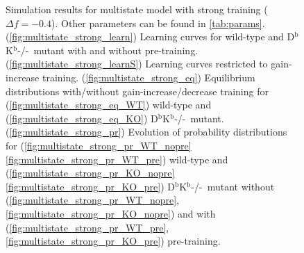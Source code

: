 \documentclass[12pt]{article}
\newcommand{\KO}{D$^\mathrm{b}$K$^\mathrm{b}$-/-}
\begin{document}
\begin{figure}
 \begin{center}
 \begin{myenuma}
  \item{}\label{fig:multistate_strong_learn}
  \item{}\label{fig:multistate_strong_learnS}
  \item\label{fig:multistate_strong_eq}\begin{myenumi}
                    \item{}\label{fig:multistate_strong_eq_WT}
                    \item{}\label{fig:multistate_strong_eq_KO}
                  \end{myenumi}
  \item\label{fig:multistate_strong_pr}\begin{myenumi}
                    \item{}\label{fig:multistate_strong_pr_WT_nopre}
                    \item{}\label{fig:multistate_strong_pr_WT_pre}
                    \item{}\label{fig:multistate_strong_pr_KO_nopre}
                    \item{}\label{fig:multistate_strong_pr_KO_pre}
                  \end{myenumi}
 \end{myenuma}
 \end{center}
  \caption{Simulation results for multistate model with strong training ($\Delta f=-0.4$).
  Other parameters can be found in \autoref{tab:params}.
  (\ref{fig:multistate_strong_learn}) Learning curves for wild-type and \KO\ mutant with and without pre-training.
  (\ref{fig:multistate_strong_learnS}) Learning curves restricted to gain-increase training.
  (\ref{fig:multistate_strong_eq}) Equilibrium distributions with/without gain-increase/decrease training for (\ref{fig:multistate_strong_eq_WT}) wild-type and (\ref{fig:multistate_strong_eq_KO}) \KO\ mutant.
  (\ref{fig:multistate_strong_pr}) Evolution of probability distributions for (\ref{fig:multistate_strong_pr_WT_nopre}\ref{fig:multistate_strong_pr_WT_pre}) wild-type and  (\ref{fig:multistate_strong_pr_KO_nopre}\ref{fig:multistate_strong_pr_KO_pre}) \KO\ mutant without (\ref{fig:multistate_strong_pr_WT_nopre},\ref{fig:multistate_strong_pr_KO_nopre}) and with (\ref{fig:multistate_strong_pr_WT_pre},\ref{fig:multistate_strong_pr_KO_pre}) pre-training. } \label{fig:multistate_strong}
\end{figure}
\end{document}
